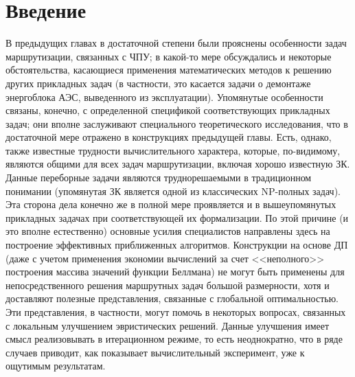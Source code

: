 
\section{
  Введение
}
\label{sect:4.1}
\setcounter{equation}{0}

В предыдущих главах в достаточной степени были прояснены особенности задач
маршрутизации, связанных с ЧПУ; в какой-то мере обсуждались и некоторые
обстоятельства, касающиеся применения математических методов к решению других
прикладных задач (в частности, это касается задачи о демонтаже энергоблока
АЭС, выведенного из эксплуатации). Упомянутые особенности связаны, конечно,
с определенной спецификой соответствующих прикладных задач; они вполне
заслуживают специального теоретического исследования, что в достаточной
мере отражено в конструкциях предыдущей главы. Есть, однако, также
известные трудности вычислительного характера, которые, по-видимому,
являются общими для всех задач  маршрутизации, включая хорошо известную
ЗК. Данные переборные задачи являются труднорешаемыми в традиционном
понимании (упомянутая ЗК является одной из классических NP-полных задач).
Эта сторона дела конечно же в полной мере проявляется и в вышеупомянутых
прикладных задачах при соответствующей  их формализации. По этой причине
(и это вполне естественно) основные усилия специалистов направлены здесь
на построение эффективных приближенных алгоритмов. Конструкции на основе
ДП (даже с учетом применения экономии вычислений за счет <<неполного>>
построения массива значений функции Беллмана) не могут быть применены для
непосредственного решения маршрутных задач большой размерности, хотя и
доставляют полезные представления, связанные с глобальной оптимальностью.
Эти представления, в частности, могут помочь в некоторых вопросах,
связанных с локальным улучшением эвристических решений. Данные улучшения
имеет смысл реализовывать в итерационном режиме, то есть неоднократно,
что в ряде случаев приводит, как показывает вычислительный эксперимент,
уже к ощутимым результатам.


